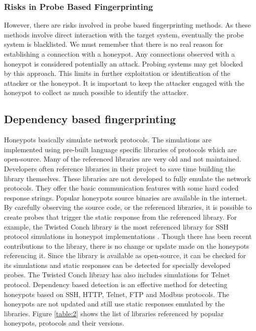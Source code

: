 \documentclass[../main.tex]{subfiles}
\begin{document}
\subsubsection{Risks in Probe Based Fingerprinting}
However, there are risks involved in probe based fingerprinting methods. As these methods involve direct interaction with the target system, eventually the probe system is blacklisted. We must remember that there is no real reason for establishing a connection with a honeypot. Any connections observed with a honeypot is considered potentially an attack. Probing systems may get blocked by this approach. This limits in further exploitation or identification of the attacker or the honeypot. It is important to keep the attacker engaged with the honeypot to collect as much possible to identify the attacker. 

\subsection{Dependency based fingerprinting}
Honeypots basically simulate network protocols. The simulations are implemented using pre-built language specific libraries of protocols which are open-source. Many of the referenced libraries are very old and not maintained. Developers often reference libraries in their project to save time building the library themselves. These libraries are not developed to fully emulate the network protocols. They offer the basic communication features with some hard coded response strings. Popular honeypots source binaries are available in the internet. By carefully observing the source code, or the referenced libraries, it is possible to create probes that trigger the static response from the referenced library. For example, the Twisted Conch\cite{twisted}  library is the most referenced library for SSH protocol simulations in honeypot implementations \cite{counting}. Though there has been recent contributions to the library, there is no change or update made on the honeypots referencing it. Since the library is available as open-source, it can be checked for its simulations and static responses can be detected for specially developed probes. The Twisted Conch library has also includes simulations for Telnet protocol. Dependency based detection is an effective method for detecting honeypots based on SSH, HTTP, Telnet, FTP and Modbus protocols. The honeypots are not updated and still use static responses emulated by the libraries. Figure \ref{table:2} \cite{Vetterl2018} shows the list of libraries referenced by popular honeypots, protocols and their versions. 
\end{document}
